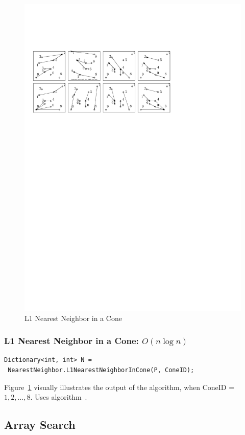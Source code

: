 \documentclass{article}
\begin{document}
\begin{figure}[h]
\includegraphics[width=\textwidth]{Figures/NearestNeighborinaCone.pdf}
\caption{L1 Nearest Neighbor in a Cone}
\label{fig:NearestNeighborinaCone}
\end{figure}

\subsubsection{L1 Nearest Neighbor in a Cone: $O(n \log n)$}
\begin{lstlisting}
Dictionary<int, int> N =
 NearestNeighbor.L1NearestNeighborInCone(P, ConeID);
\end{lstlisting}
Figure~\ref{fig:NearestNeighborinaCone} visually illustrates the output of the algorithm, when ConeID = $1,2,\ldots, 8$. Uses algorithm~\cite{?}.

\subsection{Array Search}
\end{document}
